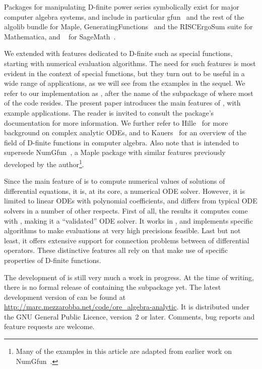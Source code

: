\documentclass[runningheads,a4paper]{llncs}
\begin{document}
Packages for manipulating D-finite power series
symbolically exist for major computer algebra systems, and include in
particular gfun~{\cite{SalvyZimmermann1994}} and the rest of the algolib
bundle for Maple, GeneratingFunctions~{\cite{Mallinger1996}} and the
RISCErgoSum suite for Mathematica, and
~{\cite{KauersJaroschekJohansson2015}} for
SageMath~{\cite{Sage}}.

We extended  with features dedicated to D-finite
{} such as special functions, starting with numerical
evaluation algorithms. The need for such features is most evident in the
context of special functions, but they turn out to be useful in a wide range
of applications, as we will see from the examples in the sequel. We refer to
our implementation as , after the name of the subpackage
of  where most of the code resides. The present paper
introduces the main features of , with example
applications. The reader is invited to consult the package's documentation for
more information. We further refer to Hille~{\cite{Hille1976}} for more
background on complex analytic ODEs, and to Kauers~{\cite{Kauers2013}} for an
overview of the field of D-finite functions in computer algebra. Also note
that  is intended to supersede
NumGfun~{\cite{Mezzarobba2010}}, a Maple package with similar features
previously developed by the author\footnote{Many of the examples in this
article are adapted from earlier work on NumGfun~{\cite{Mezzarobba2011}}.}.

Since the main feature of  is to compute numerical
values of solutions of differential equations, it is, at its core, a numerical
ODE solver. However, it is limited to linear ODEs with polynomial coefficients, and differs from typical ODE solvers in a number of other respects. First
of all, the results it computes come with {},
making it a ``validated'' ODE solver. It works in {}, and implements specific algorithms to make evaluations at very
high precisions feasible. Last but not least, it offers extensive support for
connection problems between {} of differential
operators. These distinctive features all rely on {} that make use of specific properties of D-finite functions.

The development of  is still very much a work in
progress. At the time of writing, there is no formal release of
 containing the  subpackage yet. The
latest development version of  can be found at
{\url{http://marc.mezzarobba.net/code/ore_algebra-analytic}}. It
is distributed under the GNU General Public Licence, version~2 or later.
Comments, bug reports and feature requests are welcome.
\end{document}
